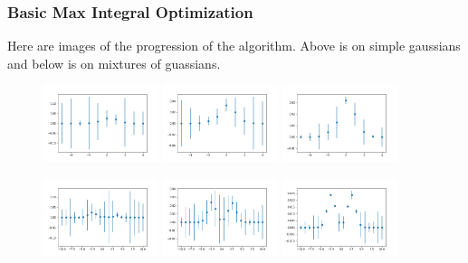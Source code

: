 \documentclass[9pt]{beamer}
\begin{document}
\begin{frame}
\frametitle{Basic Max Integral Optimization}
Here are images of the progression of the algorithm. Above is on simple gaussians and below is on mixtures of guassians.
\begin{figure}
   \includegraphics[width=0.3\textwidth]{im1}
   \hfill
   \includegraphics[width=0.3\textwidth]{im2}
   \hfill
   \includegraphics[width=0.3\textwidth]{im3}
\end{figure}
\begin{figure}
   \includegraphics[width=0.3\textwidth]{im11}
   \hfill
   \includegraphics[width=0.3\textwidth]{im12}
   \hfill
   \includegraphics[width=0.3\textwidth]{im13}
\end{figure}
\end{frame}
\end{document}
